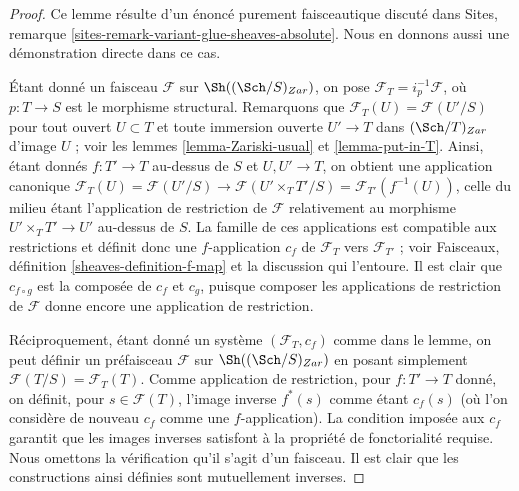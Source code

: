 \begin{proof}
Ce lemme résulte d'un énoncé purement faisceautique discuté dans
Sites, remarque \ref{sites-remark-variant-glue-sheaves-absolute}.
Nous en donnons aussi une démonstration directe dans ce cas.

\medskip\noindent
Étant donné un faisceau $\mathcal{F}$ sur $\Sh((\Sch/S)_{Zar})$,
on pose $\mathcal{F}_T = i_p^{-1}\mathcal{F}$, où $p : T \to S$
est le morphisme structural. Remarquons que
$\mathcal{F}_T(U) = \mathcal{F}(U'/S)$ pour tout ouvert $U \subset T$
et toute immersion ouverte $U' \to T$ dans $(\Sch/T)_{Zar}$
d'image $U$ ; voir les lemmes \ref{lemma-Zariski-usual} et \ref{lemma-put-in-T}.
Ainsi, étant donnés $f : T' \to T$ au-dessus de $S$ et $U, U' \to T$, on obtient une
application canonique $\mathcal{F}_T(U) = \mathcal{F}(U'/S) \to \mathcal{F}(U'\times_T T'/S)
= \mathcal{F}_{T'}(f^{-1}(U))$, celle du milieu étant l'application de restriction
de $\mathcal{F}$ relativement au morphisme
$U' \times_T T' \to U'$ au-dessus de $S$. La famille de ces applications est
compatible aux restrictions et définit donc une $f$-application $c_f$
de $\mathcal{F}_T$ vers $\mathcal{F}_{T'}$ ; voir
Faisceaux, définition \ref{sheaves-definition-f-map} et la discussion
qui l'entoure. Il est clair que $c_{f \circ g}$ est la composée de
$c_f$ et $c_g$, puisque composer les applications de restriction de $\mathcal{F}$
donne encore une application de restriction.

\medskip\noindent
Réciproquement, étant donné un système $(\mathcal{F}_T, c_f)$ comme dans le lemme,
on peut définir un préfaisceau $\mathcal{F}$ sur $\Sh((\Sch/S)_{Zar})$
en posant simplement $\mathcal{F}(T/S) = \mathcal{F}_T(T)$. Comme application de restriction,
pour $f : T' \to T$ donné, on définit, pour $s \in \mathcal{F}(T)$,
l'image inverse $f^*(s)$ comme étant $c_f(s)$ (où l'on considère de nouveau $c_f$ comme
une $f$-application). La condition imposée aux $c_f$ garantit que
les images inverses satisfont à la propriété de fonctorialité requise.
Nous omettons la vérification qu'il s'agit d'un faisceau.
Il est clair que les constructions ainsi définies sont mutuellement inverses.
\end{proof}























